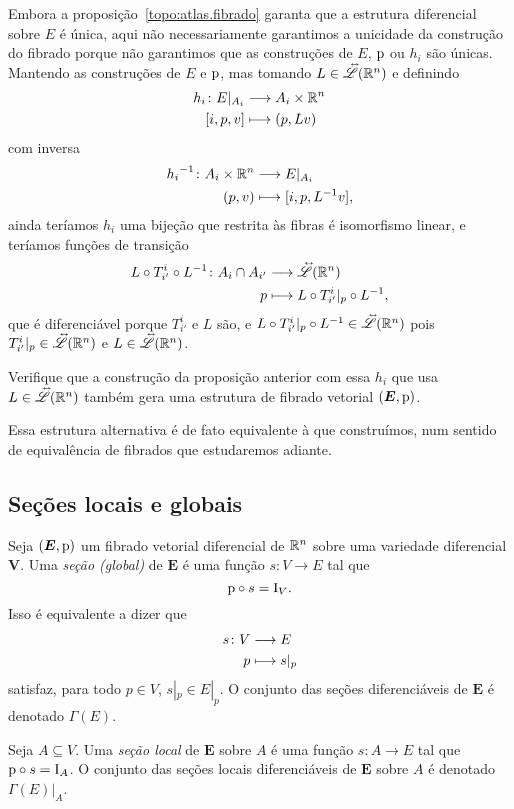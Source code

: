 Embora a proposição~\ref{topo:atlas.fibrado} garanta que a estrutura diferencial sobre $E$ é única, aqui não necessariamente garantimos a unicidade da construção do fibrado porque não garantimos que as construções de $E$, $\mathrm{p}$ ou $h_i$ são únicas. Mantendo as construções de $E$ e $\mathrm{p}$, mas tomando $L \in \accentset{\leftrightarrow}{\mathscr{L}}(\mathbb{R}^n)$ e definindo
	\begin{align*}
	{h_i}\colon {E|_{A_i}} &\longrightarrow {A_i \times \mathbb{R}^n} \\{[i,p,v]} &\longmapsto (p,L v)
	\end{align*}
com inversa	
	\begin{align*}
	{{h_i}^{-1}}\colon {A_i \times \mathbb{R}^n} &\longrightarrow {E|_{A_i}} \\{(p,v)} &\longmapsto [i,p,L^{-1} v],
	\end{align*}
ainda teríamos $h_i$ uma bijeção que restrita às fibras é isomorfismo linear, e teríamos funções de transição
	\begin{align*}
	{L \circ T^i_{i'} \circ L^{-1}}\colon {A_i \cap A_{i'}} &\longrightarrow {\accentset{\leftrightarrow}{\mathscr{L}}(\mathbb{R}^n)} \\{p} &\longmapsto L \circ T^i_{i'}|_p \circ L^{-1},
	\end{align*}
que é diferenciável porque $T^i_{i'}$ e $L$ são, e $L \circ T^i_{i'}|_p \circ L^{-1} \in \accentset{\leftrightarrow}{\mathscr{L}}(\mathbb{R}^n)$ pois $T^i_{i'}|_p \in \accentset{\leftrightarrow}{\mathscr{L}}(\mathbb{R}^n)$ e $L \in \accentset{\leftrightarrow}{\mathscr{L}}(\mathbb{R}^n)$.

\begin{exercise}
Verifique que a construção da proposição anterior com essa $h_i$ que usa $L \in \accentset{\leftrightarrow}{\mathscr{L}}(\mathbb{R}^n)$ também gera uma estrutura de fibrado vetorial $(\bm E,\mathrm{p})$.
\end{exercise}

Essa estrutura alternativa é de fato equivalente à que construímos, num sentido de equivalência de fibrados que estudaremos adiante.





\subsection{Seções locais e globais}

\newcommand{\Sec}{\Gamma}

\begin{definition}
Seja $(\bm E,\mathrm{p})$ um fibrado vetorial diferencial de $\mathbb{R}^n$ sobre uma variedade diferencial $\bm V$. Uma \emph{seção (global)} de $\bm E$ é uma função $s\colon V \to E$ tal que
	\begin{equation*}
	\mathrm{p} \circ s = \mathrm{I}_V.
	\end{equation*}
Isso é equivalente a dizer que
	\begin{align*}
	{s}\colon {V} &\longrightarrow {E} \\{p} &\longmapsto s|_p
	\end{align*}
satisfaz, para todo $p \in V$, $s|_p \in E|_p$. O conjunto das seções diferenciáveis de $\bm E$ é denotado $\Sec(E)$.

Seja $A \subseteq V$. Uma \emph{seção local} de $\bm E$ sobre $A$ é uma função $s\colon A \to E$ tal que $\mathrm{p} \circ s = \mathrm{I}_A$. O conjunto das seções locais diferenciáveis de $\bm E$ sobre $A$ é denotado $\Sec(E)|_A$.
\end{definition}

